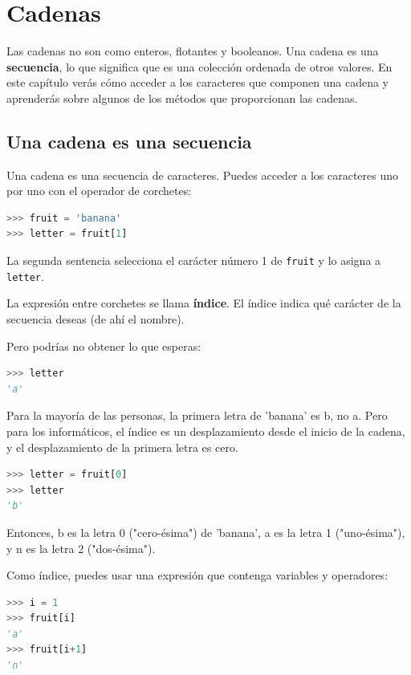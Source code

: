 
\chapter{Cadenas}

Las cadenas no son como enteros, flotantes y booleanos. Una cadena es una \textbf{secuencia}, lo que significa que es una colección ordenada de otros valores. En este capítulo verás cómo acceder a los caracteres que componen una cadena y aprenderás sobre algunos de los métodos que proporcionan las cadenas.

\section{Una cadena es una secuencia}

Una cadena es una secuencia de caracteres. Puedes acceder a los caracteres uno por uno con el operador de corchetes:

\begin{lstlisting}[language=Python]
>>> fruit = 'banana'
>>> letter = fruit[1]
\end{lstlisting}

La segunda sentencia selecciona el carácter número 1 de \texttt{fruit} y lo asigna a \texttt{letter}.

La expresión entre corchetes se llama \textbf{índice}. El índice indica qué carácter de la secuencia deseas (de ahí el nombre).

Pero podrías no obtener lo que esperas:

\begin{lstlisting}[language=Python]
>>> letter
'a'
\end{lstlisting}

Para la mayoría de las personas, la primera letra de 'banana' es b, no a. Pero para los informáticos, el índice es un desplazamiento desde el inicio de la cadena, y el desplazamiento de la primera letra es cero.

\begin{lstlisting}[language=Python]
>>> letter = fruit[0]
>>> letter
'b'
\end{lstlisting}

Entonces, b es la letra 0 ("cero-ésima") de 'banana', a es la letra 1 ("uno-ésima"), y n es la letra 2 ("dos-ésima").

Como índice, puedes usar una expresión que contenga variables y operadores:

\begin{lstlisting}[language=Python]
>>> i = 1
>>> fruit[i]
'a'
>>> fruit[i+1]
'n'
\end{lstlisting}

